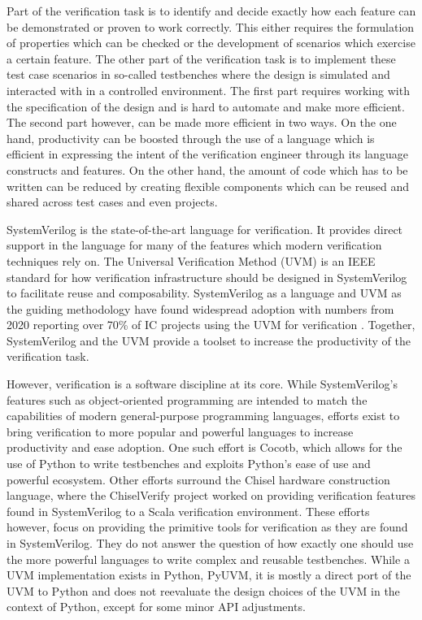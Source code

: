 Part of the verification task is to identify and decide exactly how each feature can be demonstrated or proven to
work correctly. This either requires the formulation of properties which can be checked or the development of
scenarios which exercise a certain feature. The other part of the verification task is to implement these test case
scenarios in so-called testbenches where the design is simulated and interacted with in a controlled environment. The
first part requires working with the specification of the design and is hard to automate and make more efficient. The
second part however, can be made more efficient in two ways. On the one hand, productivity can be boosted through the
use of a language which is efficient in expressing the intent of the verification engineer through its language
constructs and features. On the other hand, the amount of code which has to be written can be reduced by creating
flexible components which can be reused and shared across test cases and even projects.

SystemVerilog is the state-of-the-art language for verification. It provides direct support in the language for many
of the features which modern verification techniques rely on. The Universal Verification Method (UVM) is an IEEE
standard for how verification infrastructure should be designed in SystemVerilog to facilitate reuse and
composability. SystemVerilog as a language and UVM as the guiding methodology have found widespread adoption with
numbers from 2020 reporting over 70\% of IC projects using the UVM for verification \cite{foster2020wilson}.
Together, SystemVerilog and the UVM provide a toolset to increase the productivity of the verification task.

However, verification is a software discipline at its core. While SystemVerilog's features such as object-oriented
programming are intended to match the capabilities of modern general-purpose programming languages, efforts exist to
bring verification to more popular and powerful languages to increase productivity and ease adoption. One such effort
is Cocotb, which allows for the use of Python to write testbenches and exploits Python's ease of use and powerful
ecosystem. Other efforts surround the Chisel hardware construction language, where the ChiselVerify project worked on
providing verification features found in SystemVerilog to a Scala verification environment. These efforts however,
focus on providing the primitive tools for verification as they are found in SystemVerilog. They do not answer the
question of how exactly one should use the more powerful languages to write complex and reusable testbenches. While a
UVM implementation exists in Python, PyUVM, it is mostly a direct port of the UVM to Python and does not reevaluate
the design choices of the UVM in the context of Python, except for some minor API adjustments.


